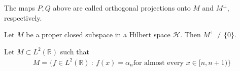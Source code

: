 \begin{definition}
  The maps $P, Q$ above are called orthogonal projections onto $M$
  and $M^\perp$, respectively.
\end{definition}

\begin{corollary}
  Let $M$ be a proper closed subspace in a Hilbert space
  $\mathcal{H}$. Then $M^\perp \neq \{ 0\}$.
\end{corollary}

\begin{exercise}
  Let $M \subset L^2(\mathbb{R})$ such that
  \begin{align*}
    M = \{ f \in L^2(\mathbb{R})  \ : \  f(x) = \alpha_n  \textrm{
    for almost every } x \in [n, n+1) \}
  \end{align*}
\end{exercise}

